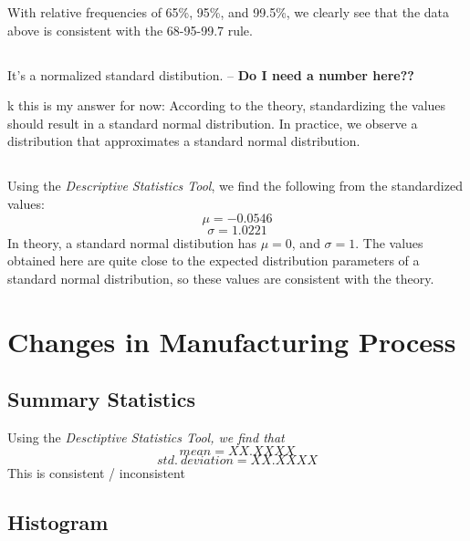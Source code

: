 \documentclass[letterpaper]{article}
\begin{document}
With relative frequencies of 65\%, 95\%, and 99.5\%, we clearly see that the
data above is consistent with the 68-95-99.7 rule.

\subsection{} %
It's a normalized standard distibution. -- \textbf{Do I need a number here??}

k this is my answer for now:
According to the theory, standardizing the values should result in a standard normal distribution.
In practice, we observe a distribution that approximates a standard normal distribution.

\subsection{} %
Using the \textit{Descriptive Statistics Tool}, we find the following from the standardized values:
$$\mu = -0.0546$$
$$\sigma = 1.0221$$
In theory, a standard normal distibution has $\mu=0$, and $\sigma=1$. The values
obtained here are quite close to the expected distribution parameters of a
standard normal distribution, so these values are consistent with the theory.

\section{Changes in Manufacturing Process}%

\subsection{Summary Statistics} %
Using the \textit{Desctiptive Statistics Tool, we find that}
$${mean} = XX.XXXX$$
$${std.\ deviation} = XX.XXXX$$
This is consistent / inconsistent

\subsection{Histogram}
\end{document}
